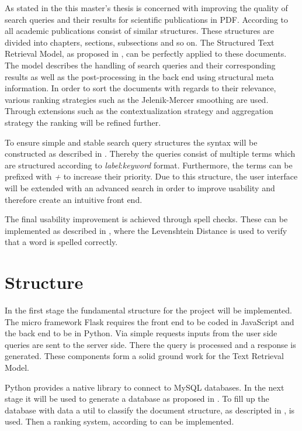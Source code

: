 \documentclass[a4paper, 12pt]{scrartcl}
\begin{document}
As stated in the  this master's thesis is concerned with improving the quality of search queries and their results for scientific
publications in PDF. According to \cite{KGJK14} all academic publications consist of similar structures. These structures are divided into chapters,
sections, subsections and so on. The Structured Text Retrieval Model, as proposed in \cite{RNBY99}, can be perfectly applied to these documents.
The model describes the handling of search queries and their corresponding results as well as the post-processing in the back end using structural meta information. 
In order to sort the documents with regards to their relevance, various ranking strategies such as the Jelenik-Mercer smoothing are used. Through extensions such as the 
contextualization strategy and aggregation strategy the ranking will be refined further.

To ensure simple and stable search query structures the syntax will be constructed as described in \cite{Coh03}. Thereby the queries consist of multiple terms
which are structured according to \textit{label}:\textit{keyword} format. Furthermore, the terms can be prefixed with \textit{+} to increase their priority. Due to
this structure, the user interface will be extended with an advanced search in order to improve usability and therefore create an intuitive front end.

The final usability improvement is achieved through spell checks. These can be implemented as described in \cite{SPCB13}, where the Levenshtein Distance is used to verify 
that a word is spelled correctly.

\section{Structure}

In the first stage the fundamental structure for the project will be implemented. The micro framework Flask\cite{Flask} requires the front end to be coded in JavaScript and the back end to be in Python.
Via simple requests inputs from the user side queries are sent to the server side. There the query is processed and a response is generated. These components form a solid ground work 
for the Text Retrieval Model.

Python provides a native library to connect to MySQL databases. In the next stage it will be used to generate a database as proposed in \cite{YA94}. To fill up the database with data a util to classify 
the document structure, as descripted in \cite{KGJK14}, is used. Then a ranking system, according to \cite{MRS08, RNBY99} can be implemented.
\end{document}
